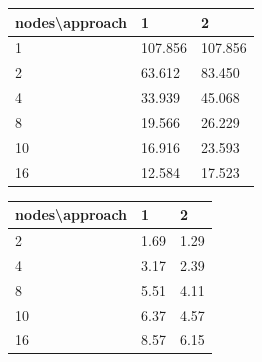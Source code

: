 \documentclass[a4paper]{article}
\begin{document}
\begin{minipage}[b]{.40\textwidth}
  \centering
  \begin{tabular}{l|l|l}
  \centering
nodes\textbackslash approach & 1 & 2 \\ \hline
1 & 107.856 & 107.856 \\ \hline
2 & 63.612 & 83.450 \\ \hline
4 & 33.939 & 45.068 \\ \hline
8 & 19.566 & 26.229 \\ \hline
10 & 16.916 & 23.593 \\ \hline
16 & 12.584 & 17.523 \\ 
    \hline
  \end{tabular}
  \label{tab:t_app1}
\end{minipage} \qquad
\begin{minipage}[b]{.40\textwidth}
  \centering
  \begin{tabular}{l|l|l}
nodes\textbackslash approach & 1 & 2 \\ \hline
2 & 1.69 & 1.29 \\ \hline
4 & 3.17 & 2.39 \\ \hline
8 & 5.51 & 4.11 \\ \hline
10 & 6.37 & 4.57 \\ \hline
16 & 8.57 & 6.15 \\ 
  \hline
  \end{tabular}
  \label{tab:t_app2}
\end{minipage}
\end{document}
